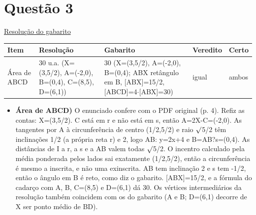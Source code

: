 \documentclass{article}%
\begin{document}
\section*{Questão 3}%
\href{https://poliedroresolve.sistemapoliedro.com.br/vestibulares/ita/2026/ita-2-fase-dia-1-28-10-2025-2-fase-dia-1/dissertativa-3-matematica-2-fase-dia-1-ita-2026}{Resolução do gabarito}\par\smallskip%
\begin{longtable}{@{}p{} p{} p{} p{} p{}@{}}\toprule Item & Resolução & Gabarito & Veredito & Certo \\ \midrule
Área de ABCD & 30 u.a. (X=(3,5/2), A=(-2,0), B=(0,4), C=(8,5), D=(6,1)) & 30 (X=(3,5/2), A=(-2,0), B=(0,4); ABX retângulo em B, {[}ABX{]}=15/2, {[}ABCD{]}=4$\cdot${[}ABX{]}=30) & igual & ambos \\
\bottomrule\end{longtable}%
\begin{itemize}%
\item%
\textbf{Área de ABCD)} O enunciado confere com o PDF original (p. 4). Refiz as contas: X=(3,5/2). C está em r e não está em s, então A=2X-C=(-2,0). As tangentes por A à circunferência de centro (1/2,5/2) e raio $\surd$5/2 têm inclinações 1/2 (a própria reta r) e 2, logo AB: y=2x+4 e B=AB?s=(0,4). As distâncias de I a r, a s e a AB valem todas $\surd$5/2. O incentro calculado pela média ponderada pelos lados sai exatamente (1/2,5/2), então a circunferência é mesmo a inscrita, e não uma exinscrita. AB tem inclinação 2 e s tem -1/2, então o ângulo em B é reto, como diz o gabarito. {[}ABX{]}=15/2, e a fórmula do cadarço com A, B, C=(8,5) e D=(6,1) dá 30. Os vértices intermediários da resolução também coincidem com os do gabarito (A e B; D=(6,1) decorre de X ser ponto médio de BD).%
\end{itemize}%
\end{document}
